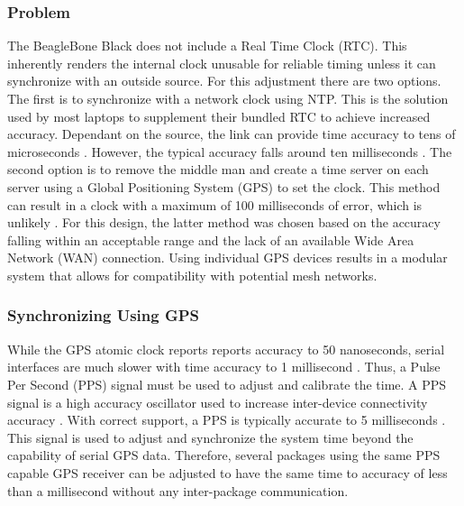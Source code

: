 \subsubsection{Problem}
The BeagleBone Black does not include a Real Time Clock (RTC). This inherently renders the internal clock unusable for reliable timing unless it can
synchronize with an outside source. For this adjustment there are two options. The first is to synchronize with a network clock using NTP. This is the
solution used by most laptops to supplement their bundled RTC to achieve increased accuracy. Dependant on the source, the link can provide time accuracy
to tens of microseconds \cite{NTP}. However, the typical accuracy falls around ten milliseconds \cite{GPSD}. The second option is to remove the middle
man and create a time server on each server using a Global Positioning System (GPS) to set the clock. This method can result in a clock with a maximum
of 100 milliseconds of error, which is unlikely \cite{GPSD}. For this design, the latter method was chosen based on the accuracy falling within an
acceptable range and the lack of an available Wide Area Network (WAN) connection. Using individual GPS devices results in a modular system that
allows for compatibility with potential mesh networks. 

\subsubsection{Synchronizing Using GPS}
While the GPS atomic clock reports reports accuracy to 50 nanoseconds, serial interfaces are much slower with time accuracy to 1 millisecond \cite{GPSD}.
Thus, a Pulse Per Second (PPS) signal must be used to adjust and calibrate the time. A PPS signal is a high accuracy oscillator used to increase
inter-device connectivity accuracy \cite{PPS}. With correct support, a PPS is typically accurate to 5 milliseconds \cite{GPSD}. This signal is used to
adjust and synchronize the system time beyond the capability of serial GPS data. Therefore, several packages using the same PPS capable GPS receiver can
be adjusted to have the same time to accuracy of less than a millisecond without any inter-package communication.

